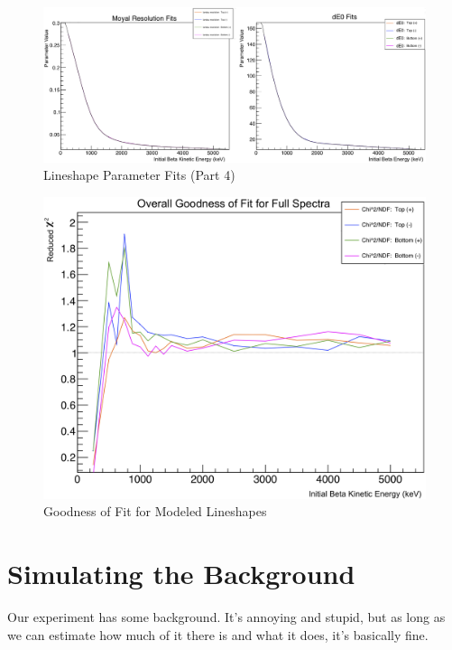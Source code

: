 \begin{figure}[h!!tb]
	\centering
	\includegraphics[width=.999\linewidth]
	{Figures/LineshapeParams_part4.png}
	\caption[Lineshape Parameter Fits (Part 4)]{Lineshape Parameter Fits (Part 4)}	
	\label{fig:lineshapeparams_part4}
\end{figure}
%
\begin{figure}[h!!tb]
	\centering
	\includegraphics[width=.999\linewidth]
	{Figures/Lineshape_Chi2.png}
	\caption[Goodness of Fit for Modeled Lineshapes]{Goodness of Fit for Modeled Lineshapes}	
	\label{fig:lineshape_redchi2}
\end{figure}
%


\section{Simulating the Background}
\label{sec:tof_bg}
Our experiment has some background.  It's annoying and stupid, but as long as we can estimate how much of it there is and what it does, it's basically fine.

